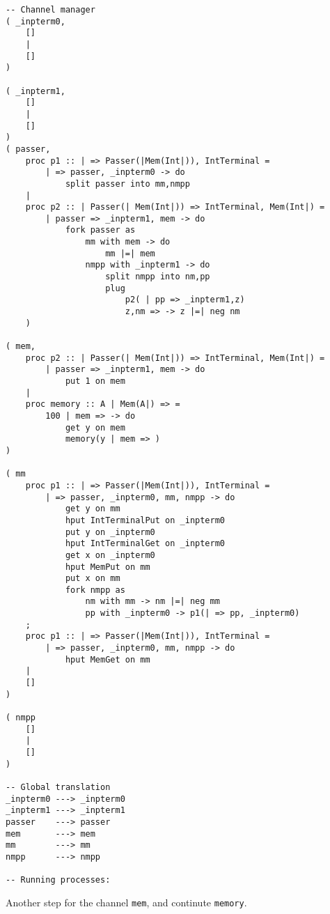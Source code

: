 \documentclass{article}
\theoremstyle{plain}%
\theoremstyle{definition}
\theoremstyle{remark}
\begin{document}
\begin{verbatim}
-- Channel manager
( _inpterm0,  
    []
    |
    []
)

( _inpterm1,  
    []
    |
    []
)
( passer,
    proc p1 :: | => Passer(|Mem(Int|)), IntTerminal = 
        | => passer, _inpterm0 -> do
            split passer into mm,nmpp 
    |
    proc p2 :: | Passer(| Mem(Int|)) => IntTerminal, Mem(Int|) =
        | passer => _inpterm1, mem -> do
            fork passer as
                mm with mem -> do
                    mm |=| mem
                nmpp with _inpterm1 -> do
                    split nmpp into nm,pp
                    plug
                        p2( | pp => _inpterm1,z)
                        z,nm => -> z |=| neg nm
    )

( mem,
    proc p2 :: | Passer(| Mem(Int|)) => IntTerminal, Mem(Int|) =
        | passer => _inpterm1, mem -> do
            put 1 on mem
    |
    proc memory :: A | Mem(A|) => =
        100 | mem => -> do
            get y on mem
            memory(y | mem => )
)

( mm
    proc p1 :: | => Passer(|Mem(Int|)), IntTerminal = 
        | => passer, _inpterm0, mm, nmpp -> do
            get y on mm
            hput IntTerminalPut on _inpterm0
            put y on _inpterm0
            hput IntTerminalGet on _inpterm0
            get x on _inpterm0
            hput MemPut on mm
            put x on mm
            fork nmpp as
                nm with mm -> nm |=| neg mm
                pp with _inpterm0 -> p1(| => pp, _inpterm0)
    ;
    proc p1 :: | => Passer(|Mem(Int|)), IntTerminal = 
        | => passer, _inpterm0, mm, nmpp -> do
            hput MemGet on mm 
    |
    []
)

( nmpp
    []
    |
    []
)

-- Global translation
_inpterm0 ---> _inpterm0 
_inpterm1 ---> _inpterm1 
passer    ---> passer 
mem       ---> mem
mm        ---> mm
nmpp      ---> nmpp

-- Running processes:
\end{verbatim}

Another step for the channel \verb|mem|, and continute \verb|memory|.
\end{document}
